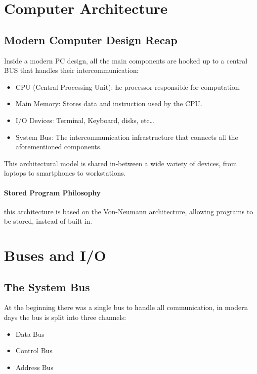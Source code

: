 \documentclass[openright, twoside]{report}
\theoremstyle{definition}
\theoremstyle{example}
\begin{document}
	\section{Computer Architecture}
		\subsection{Modern Computer Design Recap}

		Inside a modern PC design, all the main components are
		hooked up to a central BUS that handles their intercommunication:
		
	\begin{itemize}
		\item CPU (Central Processing Unit): he processor responsible for computation.
		\item Main Memory: Stores data and instruction used by the CPU.
		\item I/O Devices: Terminal, Keyboard, disks, etc\dots
		\item System Bus: The intercommunication infrastructure that 
		connects all the aforementioned components.
	\end{itemize}

		This architectural model is shared in-between a wide variety of devices, 
		from laptops to smartphones to workstations.
		
		\paragraph{Stored Program Philosophy} 
		this architecture is based on the Von-Neumann architecture, 
		allowing programs to be stored, instead of built in.

	\section{Buses and I/O}
		\subsection{The System Bus}
		At the beginning there was a single bus to handle all communication, in modern days the bus is split into three channels:
		
		\begin{multicols}{3}
			\begin{itemize}
				\item Data Bus
				\item Control Bus
				\item Address Bus
			\end{itemize}
		\end{multicols}
		
\end{document}
